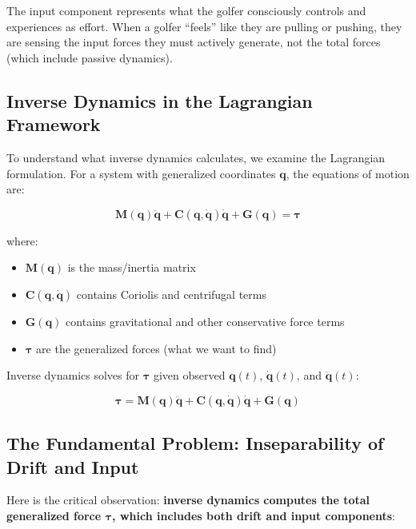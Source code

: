 \documentclass[11pt,a4paper]{article}
\newcommand{\bvec}[1]{\mathbf{#1}}
\theoremstyle{definition}
\theoremstyle{plain}
\begin{document}
\begin{keypoint}
The input component represents what the golfer consciously controls and experiences as effort. When a golfer ``feels'' like they are pulling or pushing, they are sensing the input forces they must actively generate, not the total forces (which include passive dynamics).
\end{keypoint}

\subsection{Inverse Dynamics in the Lagrangian Framework}

To understand what inverse dynamics calculates, we examine the Lagrangian formulation. For a system with generalized coordinates $\bvec{q}$, the equations of motion are:

\begin{equation}
\label{eq:lagrange}
\bvec{M}(\bvec{q})\ddot{\bvec{q}} + \bvec{C}(\bvec{q},\dot{\bvec{q}})\dot{\bvec{q}} + \bvec{G}(\bvec{q}) = \bvec{\tau}
\end{equation}

where:
\begin{itemize}
    \item $\bvec{M}(\bvec{q})$ is the mass/inertia matrix
    \item $\bvec{C}(\bvec{q},\dot{\bvec{q}})$ contains Coriolis and centrifugal terms
    \item $\bvec{G}(\bvec{q})$ contains gravitational and other conservative force terms
    \item $\bvec{\tau}$ are the generalized forces (what we want to find)
\end{itemize}

Inverse dynamics solves for $\bvec{\tau}$ given observed $\bvec{q}(t)$, $\dot{\bvec{q}}(t)$, and $\ddot{\bvec{q}}(t)$:

\begin{equation}
\label{eq:inverse_dynamics}
\bvec{\tau} = \bvec{M}(\bvec{q})\ddot{\bvec{q}} + \bvec{C}(\bvec{q},\dot{\bvec{q}})\dot{\bvec{q}} + \bvec{G}(\bvec{q})
\end{equation}

\subsection{The Fundamental Problem: Inseparability of Drift and Input}

Here is the critical observation: \textbf{inverse dynamics computes the total generalized force $\bvec{\tau}$, which includes both drift and input components}:
\end{document}
